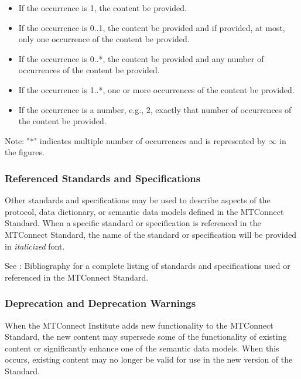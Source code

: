 \begin{itemize}

\item If the \gls{occurrence} is 1, the content \MUST be provided.

\item If the \gls{occurrence} is 0..1, the content \MAY be provided and if provided, at most, only one occurrence of the content \MUST be provided.

\item If the \gls{occurrence} is 0..*, the content \MAY be provided and any number of occurrences of the content \MAY be provided.

\item If the \gls{occurrence} is 1..*, one or more occurrences of the content \MUST be provided.

\item If the \gls{occurrence} is a number, e.g., 2, exactly that number of occurrences of the content \MUST be provided.

\end{itemize}

\begin{note}
Note: "*" indicates multiple number of occurrences and is represented by $\infty$ in the figures.

\end{note}

\subsubsection{Referenced Standards and Specifications}

Other standards and specifications may be used to describe aspects of the protocol, \gls{data dictionary}, or \glspl{semantic data model} defined in the MTConnect Standard.  When a specific standard or specification is referenced in the MTConnect Standard, the name of the standard or specification will be provided in \textit{italicized} font.  

See :  Bibliography for a complete listing of standards and specifications used or referenced in the MTConnect Standard. 

\subsubsection{Deprecation and Deprecation Warnings}

When the MTConnect Institute adds new functionality to the MTConnect Standard, the new content may supersede some of the functionality of existing content or significantly enhance one of the \glspl{semantic data model}.  When this occurs, existing content may no longer be valid for use in the new version of the Standard.

